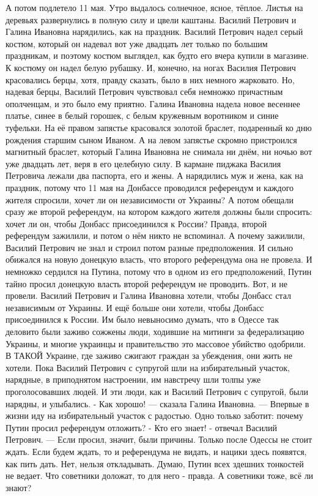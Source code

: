 А потом подлетело 11 мая. Утро выдалось солнечное, ясное, тёплое. Листья на деревьях развернулись в полную силу и цвели каштаны.
Василий Петрович и Галина Ивановна нарядились, как на праздник. Василий Петрович надел серый костюм, который он надевал вот уже двадцать лет только по большим праздникам, и поэтому костюм выглядел, как будто его вчера купили в магазине. К костюму он надел белую рубашку. И, конечно, на ногах Василия Петрович красовались берцы, хотя, правду сказать, было в них немного жарковато. Но, надевая берцы, Василий Петрович чувствовал себя немножко причастным ополченцам, и это было ему приятно.
Галина Ивановна надела новое весеннее платье, синее в белый горошек, с белым кружевным воротником и синие туфельки. На её правом запястье красовался золотой браслет, подаренный ко дню рождения старшим сыном Иваном. А на левом запястье скромно пристроился магнитный браслет, который Галина Ивановна не снимала ни днём, ни ночью вот уже двадцать лет, веря в его целебную силу.
В кармане пиджака Василия Петровича лежали два паспорта, его и жены. А нарядились муж и жена, как на праздник, потому что 11 мая на Донбассе проводился референдум и каждого жителя спросили, хочет ли он независимости от Украины? А потом обещали сразу же второй референдум, на котором каждого жителя должны были спросить: хочет ли он, чтобы Донбасс присоединился к России?
Правда, второй референдум зажилили, и потом о нём никто не вспоминал. А почему зажилили, Василий Петрович не знал и строил потом разные предположения. И сильно обижался на новую донецкую власть, что второго референдума она не провела. И немножко сердился на Путина, потому что в одном из его предположений, Путин тайно просил донецкую власть второй референдум не проводить. Вот, и не провели.
Василий Петрович и Галина Ивановна хотели, чтобы Донбасс стал независимым от Украины. И ещё больше они хотели, чтобы Донбасс присоединился к России. Им было невыносимо думать, что в Одессе так деловито были заживо сожжены люди, ходившие на митинги за федерализацию Украины, и многие украинцы и правительство это массовое убийство одобрили. В ТАКОЙ Украине, где заживо сжигают граждан за убеждения, они жить не хотели.
Пока Василий Петрович с супругой шли на избирательный участок, нарядные, в приподнятом настроении, им навстречу шли толпы уже проголосовавших людей. И эти люди, как и Василий Петрович с супругой, были нарядны, и улыбались.
- Как хорошо! --- сказала Галина Ивановна. --- Впервые в жизни иду на избирательный участок с радостью. Одно только заботит: почему Путин просил референдум отложить?
- Кто его знает! - отвечал Василий Петрович. --- Если просил, значит, были причины. Только после Одессы не стоит ждать. Если будем ждать, то и референдума не видать, и нацики здесь появятся, как пить дать. Нет, нельзя откладывать. Думаю, Путин всех здешних тонкостей не ведает. Что советники доложат, то для него - правда. А советники тоже, всё ли знают?
